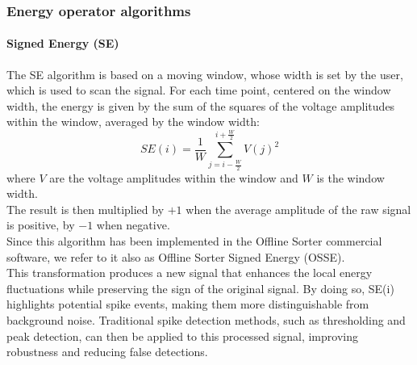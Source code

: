 \subsubsection{Energy operator algorithms}
\paragraph{Signed Energy (SE)}
The SE algorithm is based on a moving window, whose width is set by the user,
which is used to scan the signal. For each time point, centered on the window width,
the energy is given by the sum of the squares of the voltage amplitudes within the
window, averaged by the window width:
\begin{equation*}
    SE(i)=\frac{1}{W}\sum_{j=i-\frac{W}{2}}^{i+\frac{W}{2}}V(j)^2
\end{equation*}
where \(V\) are the voltage amplitudes within the window and \(W\) is the window width.\\
The result is then multiplied by \(+1\) when the average amplitude of the raw signal is positive,
by \(-1\) when negative.\\
Since this algorithm has been implemented in the Offline Sorter commercial software,
we refer to it also as Offline Sorter Signed Energy (OSSE). \\
This transformation produces a new signal that enhances the local energy fluctuations while preserving the sign of the original signal. By doing so, SE(i) highlights potential spike events, making them more distinguishable from background noise. Traditional spike detection methods, such as thresholding and peak detection, can then be applied to this processed signal, improving robustness and reducing false detections.
